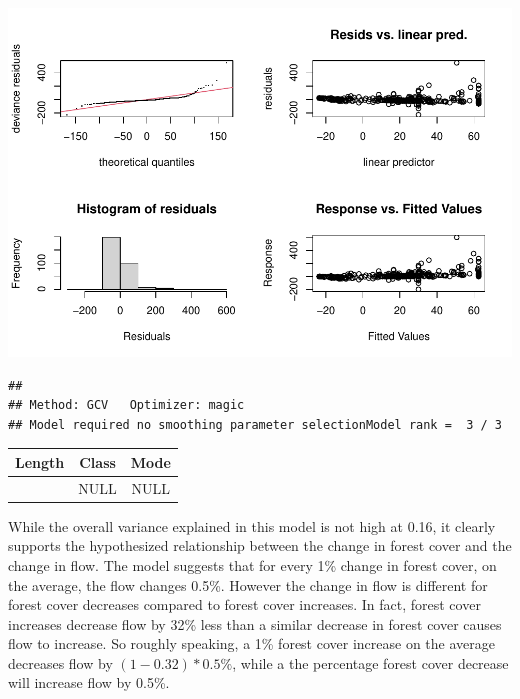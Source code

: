 \documentclass[]{elsarticle} %
\begin{document}
\includegraphics{Forest_and_Water_files/figure-latex/model1-1.pdf}

\begin{verbatim}
## 
## Method: GCV   Optimizer: magic
## Model required no smoothing parameter selectionModel rank =  3 / 3
\end{verbatim}

\begin{longtable}[]{@{}ccc@{}}
\toprule
\begin{minipage}[b]{0.11\columnwidth}\centering
Length\strut
\end{minipage} & \begin{minipage}[b]{0.10\columnwidth}\centering
Class\strut
\end{minipage} & \begin{minipage}[b]{0.10\columnwidth}\centering
Mode\strut
\end{minipage}\tabularnewline
\midrule
\endhead
\begin{minipage}[t]{0.11\columnwidth}\centering
0\strut
\end{minipage} & \begin{minipage}[t]{0.10\columnwidth}\centering
NULL\strut
\end{minipage} & \begin{minipage}[t]{0.10\columnwidth}\centering
NULL\strut
\end{minipage}\tabularnewline
\bottomrule
\end{longtable}

While the overall variance explained in this model is not high at 0.16,
it clearly supports the hypothesized relationship between the change in
forest cover and the change in flow. The model suggests that for every
1\% change in forest cover, on the average, the flow changes 0.5\%.
However the change in flow is different for forest cover decreases
compared to forest cover increases. In fact, forest cover increases
decrease flow by 32\% less than a similar decrease in forest cover
causes flow to increase. So roughly speaking, a 1\% forest cover
increase on the average decreases flow by \((1 - 0.32)*0.5\%\), while a
the percentage forest cover decrease will increase flow by 0.5\%.
\end{document}
